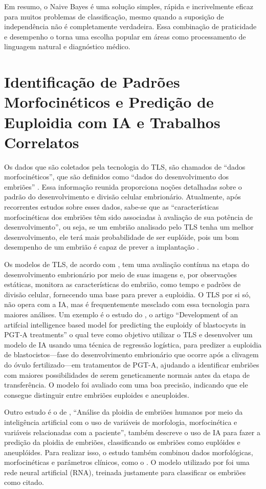 Em resumo, o Naive Bayes é uma solução simples, rápida e incrivelmente eficaz para muitos problemas de classificação, mesmo quando a suposição de independência não é completamente verdadeira. Essa combinação de praticidade e desempenho o torna uma escolha popular em áreas como processamento de linguagem natural e diagnóstico médico.

\section{Identificação de Padrões Morfocinéticos e Predição de Euploidia com IA e Trabalhos Correlatos}

Os dados que são coletados pela tecnologia do TLS, são chamados de “dados morfocinéticos”, que são definidos como “dados do desenvolvimento dos embriões” \cite{oliveira2024}. Essa informação reunida proporciona noções detalhadas sobre o padrão do desenvolvimento e divisão celular embrionário. Atualmente, após recorrentes estudos sobre esses dados, sabe-se que as “características morfocinéticas dos embriões têm sido associadas à avaliação de sua potência de desenvolvimento”, ou seja, se um embrião analisado pelo TLS tenha um melhor desenvolvimento, ele terá mais probabilidade de ser euplóide, pois um bom desempenho de um embrião é capaz de prever a implantação \cite{yuan2023}.

Os modelos de TLS, de acordo com , tem uma avaliação contínua na etapa do desenvolvimento embrionário por meio de suas imagens e, por observações estáticas, monitora as características do embrião, como tempo e padrões de divisão celular, fornecendo uma base para prever a euploidia. O TLS por si só, não opera com a IA, mas é frequentemente mesclado com essa tecnologia para maiores análises. Um exemplo é o estudo do , o artigo “Development of an artifcial intelligence based model for predicting the euploidy of blastocysts in PGT‐A treatments” o qual teve como objetivo utilizar o TLS e desenvolver um modelo de IA usando uma técnica de regressão logística, para predizer a euploidia de blastocistos—fase do desenvolvimento embrionário que ocorre após a clivagem do óvulo fertilizado—em tratamentos de PGT-A, ajudando a identificar embriões com maiores possibilidades de serem geneticamente normais antes da etapa de transferência. O modelo foi avaliado com uma boa precisão, indicando que ele consegue distinguir entre embriões euploides e aneuploides.

Outro estudo é o de , “Análise da ploidia de embriões humanos por meio da inteligência artificial com o uso de variáveis de morfologia, morfocinética e variáveis relacionadas com a paciente”, também descreve o uso de IA para fazer a predição da ploidia de embriões, classificando os embriões como euplóides e aneuplóides. Para realizar isso, o estudo também combinou dados morfológicas, morfocinéticas e parâmetros clínicos, como o . O modelo utilizado por foi uma rede neural artificial (RNA), treinada justamente para classificar os embriões como citado.

